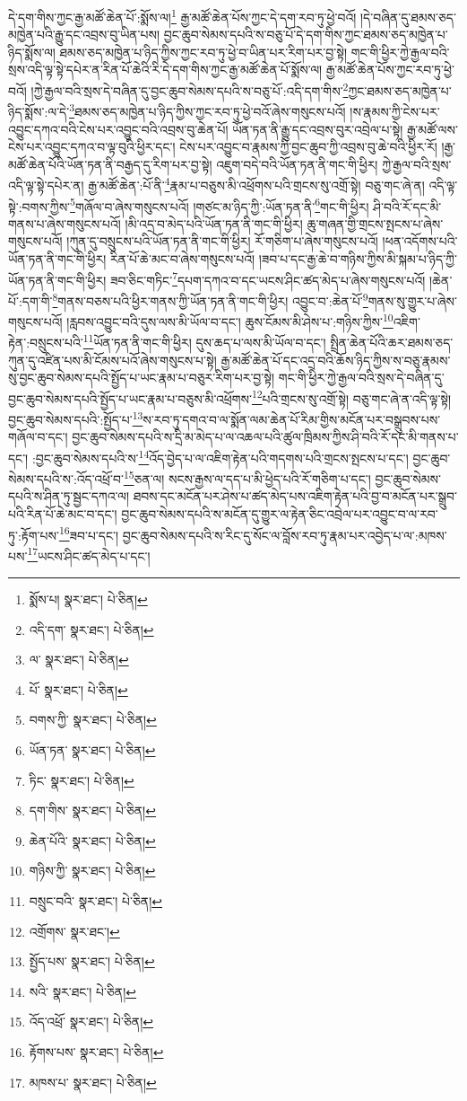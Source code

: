 དེ་དག་གིས་ཀྱང་རྒྱ་མཚོ་ཆེན་པོ་:སྨོས་ལ།\footnote{སྨོས་པ།  སྣར་ཐང་།  པེ་ཅིན། } རྒྱ་མཚོ་ཆེན་པོས་ཀྱང་དེ་དག་རབ་ཏུ་ཕྱེ་བའོ། །དེ་བཞིན་དུ་ཐམས་ཅད་མཁྱེན་པའི་རྒྱུ་དང་འབྲས་བུ་ཡིན་པས། བྱང་ཆུབ་སེམས་དཔའི་ས་བཅུ་པོ་དེ་དག་གིས་ཀྱང་ཐམས་ཅད་མཁྱེན་པ་ཉིད་སྨོས་ལ། ཐམས་ཅད་མཁྱེན་པ་ཉིད་ཀྱིས་ཀྱང་རབ་ཏུ་ཕྱེ་བ་ཡིན་པར་རིག་པར་བྱ་སྟེ། གང་གི་ཕྱིར་ཀྱེ་རྒྱལ་བའི་སྲས་འདི་ལྟ་སྟེ་དཔེར་ན་རིན་པོ་ཆེའི་རི་དེ་དག་གིས་ཀྱང་རྒྱ་མཚོ་ཆེན་པོ་སྨོས་ལ། རྒྱ་མཚོ་ཆེན་པོས་ཀྱང་རབ་ཏུ་ཕྱེ་བའོ། །ཀྱེ་རྒྱལ་བའི་སྲས་དེ་བཞིན་དུ་བྱང་ཆུབ་སེམས་དཔའི་ས་བཅུ་པོ་:འདི་དག་གིས་\footnote{འདི་དག་  སྣར་ཐང་།  པེ་ཅིན། }ཀྱང་ཐམས་ཅད་མཁྱེན་པ་ཉིད་སྨོས་:ལ་དེ་\footnote{ལ་  སྣར་ཐང་།  པེ་ཅིན། }ཐམས་ཅད་མཁྱེན་པ་ཉིད་ཀྱིས་ཀྱང་རབ་ཏུ་ཕྱེ་བའོ་ཞེས་གསུངས་པའོ། །ས་རྣམས་ཀྱི་ངེས་པར་འབྱུང་དཀའ་བའི་ངེས་པར་འབྱུང་བའི་འབྲས་བུ་ཆེན་པོ། ཡོན་ཏན་ནི་རྒྱུ་དང་འབྲས་བུར་འབྲེལ་པ་སྟེ། རྒྱ་མཚོ་ལས་ངེས་པར་འབྱུང་དཀའ་བ་ལྟ་བུའི་ཕྱིར་དང་། ངེས་པར་འབྱུང་བ་རྣམས་ཀྱི་བྱང་ཆུབ་ཀྱི་འབྲས་བུ་ཆེ་བའི་ཕྱིར་རོ། །རྒྱ་མཚོ་ཆེན་པོའི་ཡོན་ཏན་ནི་བརྒྱད་དུ་རིག་པར་བྱ་སྟེ། འཇུག་བདེ་བའི་ཡོན་ཏན་ནི་གང་གི་ཕྱིར། ཀྱེ་རྒྱལ་བའི་སྲས་འདི་ལྟ་སྟེ་དཔེར་ན། རྒྱ་མཚོ་ཆེན་:པོ་ནི་\footnote{པོ་  སྣར་ཐང་།  པེ་ཅིན། }རྣམ་པ་བཅུས་མི་འཕྲོགས་པའི་གྲངས་སུ་འགྲོ་སྟེ། བཅུ་གང་ཞེ་ན། འདི་ལྟ་སྟེ་:བགས་ཀྱིས་\footnote{བགས་ཀྱི་  སྣར་ཐང་།  པེ་ཅིན། }གཞོལ་བ་ཞེས་གསུངས་པའོ། །གཙང་མ་ཉིད་ཀྱི་:ཡོན་ཏན་ནི་\footnote{ཡོན་ཏན་  སྣར་ཐང་།  པེ་ཅིན། }གང་གི་ཕྱིར། ཤི་བའི་རོ་དང་མི་གནས་པ་ཞེས་གསུངས་པའོ། །མི་འདྲ་བ་མེད་པའི་ཡོན་ཏན་ནི་གང་གི་ཕྱིར། ཆུ་གཞན་གྱི་གྲངས་སྤངས་པ་ཞེས་གསུངས་པའོ། །ཀུན་དུ་བསྲུངས་པའི་ཡོན་ཏན་ནི་གང་གི་ཕྱིར། རོ་གཅིག་པ་ཞེས་གསུངས་པའོ། །ཕན་འདོགས་པའི་ཡོན་ཏན་ནི་གང་གི་ཕྱིར། རིན་པོ་ཆེ་མང་བ་ཞེས་གསུངས་པའོ། །ཟབ་པ་དང་རྒྱ་ཆེ་བ་གཉིས་ཀྱིས་མི་སྐམ་པ་ཉིད་ཀྱི་ཡོན་ཏན་ནི་གང་གི་ཕྱིར། ཟབ་ཅིང་གཏིང་\footnote{ཏིང་  སྣར་ཐང་།  པེ་ཅིན། }དཔག་དཀའ་བ་དང་ཡངས་ཤིང་ཚད་མེད་པ་ཞེས་གསུངས་པའོ། །ཆེན་པོ་:དག་གི་\footnote{དག་གིས་  སྣར་ཐང་།  པེ་ཅིན། }གནས་བཅས་པའི་ཕྱིར་གནས་ཀྱི་ཡོན་ཏན་ནི་གང་གི་ཕྱིར། འབྱུང་བ་:ཆེན་པོ་\footnote{ཆེན་པོའི་  སྣར་ཐང་།  པེ་ཅིན། }གནས་སུ་གྱུར་པ་ཞེས་གསུངས་པའོ། །རླབས་འབྱུང་བའི་དུས་ལས་མི་ཡོལ་བ་དང་། ཆུས་ངོམས་མི་ཤེས་པ་:གཉིས་ཀྱིས་\footnote{གཉིས་ཀྱི་  སྣར་ཐང་།  པེ་ཅིན། }འཇིག་རྟེན་:བསྲུངས་པའི་\footnote{བསྲུང་བའི་  སྣར་ཐང་།  པེ་ཅིན། }ཡོན་ཏན་ནི་གང་གི་ཕྱིར། དུས་ཆད་པ་ལས་མི་ཡོལ་བ་དང་། སྤྲིན་ཆེན་པོའི་ཆར་ཐམས་ཅད་ཀུན་དུ་འཛིན་པས་མི་ངོམས་པའོ་ཞེས་གསུངས་པ་སྟེ། རྒྱ་མཚོ་ཆེན་པོ་དང་འདྲ་བའི་ཆོས་ཉིད་ཀྱིས་ས་བཅུ་རྣམས་སུ་བྱང་ཆུབ་སེམས་དཔའི་སྤྱོད་པ་ཡང་རྣམ་པ་བཅུར་རིག་པར་བྱ་སྟེ། གང་གི་ཕྱིར་ཀྱེ་རྒྱལ་བའི་སྲས་དེ་བཞིན་དུ་བྱང་ཆུབ་སེམས་དཔའི་སྤྱོད་པ་ཡང་རྣམ་པ་བཅུས་མི་འཕྲོགས་\footnote{འགྲོགས་  སྣར་ཐང་། }པའི་གྲངས་སུ་འགྲོ་སྟེ། བཅུ་གང་ཞེ་ན་འདི་ལྟ་སྟེ། བྱང་ཆུབ་སེམས་དཔའི་:སྤྱོད་པ་\footnote{སྤྱོད་པས་  སྣར་ཐང་།  པེ་ཅིན། }ས་རབ་ཏུ་དགའ་བ་ལ་སྨོན་ལམ་ཆེན་པོ་རིམ་གྱིས་མངོན་པར་བསྒྲུབས་པས་གཞོལ་བ་དང་། བྱང་ཆུབ་སེམས་དཔའི་ས་དྲི་མ་མེད་པ་ལ་འཆལ་པའི་ཚུལ་ཁྲིམས་ཀྱིས་ཤི་བའི་རོ་དང་མི་གནས་པ་དང་། :བྱང་ཆུབ་སེམས་དཔའི་ས་\footnote{སའི་  སྣར་ཐང་།  པེ་ཅིན། }འོད་བྱེད་པ་ལ་འཇིག་རྟེན་པའི་གདགས་པའི་གྲངས་སྤངས་པ་དང་། བྱང་ཆུབ་སེམས་དཔའི་ས་:འོད་འཕྲོ་བ་\footnote{འོད་འཕྲོ་  སྣར་ཐང་།  པེ་ཅིན། }ཅན་ལ། སངས་རྒྱས་ལ་དད་པ་མི་ཕྱེད་པའི་རོ་གཅིག་པ་དང་། བྱང་ཆུབ་སེམས་དཔའི་ས་ཤིན་ཏུ་སྦྱང་དཀའ་ལ། ཐབས་དང་མངོན་པར་ཤེས་པ་ཚད་མེད་པས་འཇིག་རྟེན་པའི་བྱ་བ་མངོན་པར་སྒྲུབ་པའི་རིན་པོ་ཆེ་མང་བ་དང་། བྱང་ཆུབ་སེམས་དཔའི་ས་མངོན་དུ་གྱུར་ལ་རྟེན་ཅིང་འབྲེལ་པར་འབྱུང་བ་ལ་རབ་ཏུ་:རྟོག་པས་\footnote{རྟོགས་པས་  སྣར་ཐང་།  པེ་ཅིན། }ཟབ་པ་དང་། བྱང་ཆུབ་སེམས་དཔའི་ས་རིང་དུ་སོང་ལ་བློས་རབ་ཏུ་རྣམ་པར་འབྱེད་པ་ལ་:མཁས་པས་\footnote{མཁས་པ་  སྣར་ཐང་།  པེ་ཅིན། }ཡངས་ཤིང་ཚད་མེད་པ་དང་། 
